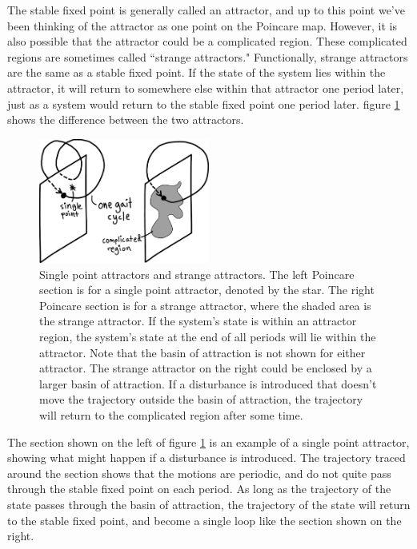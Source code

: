 The stable fixed point is generally called an attractor, and up to this point we've been thinking of the attractor as one point on the Poincare map. However, it is also possible that the attractor could be a complicated region. These complicated regions are sometimes called ``strange attractors." Functionally, strange attractors are the same as a stable fixed point. If the state of the system lies within the attractor, it will return to somewhere else within that attractor one period later, just as a system would return to the stable fixed point one period later. figure \ref{fig:Attractors} shows the difference between the two attractors.

\begin{figure}[h]		%
\begin{centering}
\includegraphics[width=0.5\textwidth]{Figures/Attractors}\par
\end{centering}
\caption[Diagram: Single Point Attractors and Strange Attractors]{Single point attractors and strange attractors. The left Poincare section is for a single point attractor, denoted by the star. The right Poincare section is for a strange attractor, where the shaded area is the strange attractor. If the system's state is within an attractor region, the system's state at the end of all periods will lie within the attractor. Note that the basin of attraction is not shown for either attractor. The strange attractor on the right could be enclosed by a larger basin of attraction. If a disturbance is introduced that doesn't move the trajectory outside the basin of attraction, the trajectory will return to the complicated region after some time.}
\label{fig:Attractors}
\end{figure}
%

The section shown on the left of figure \ref{fig:Attractors} is an example of a single point attractor, showing what might happen if a disturbance is introduced. The trajectory traced around the section shows that the motions are periodic, and do not quite pass through the stable fixed point on each period. As long as the trajectory of the state passes through the basin of attraction, the trajectory of the state will return to the stable fixed point, and become a single loop like the section shown on the right. 

